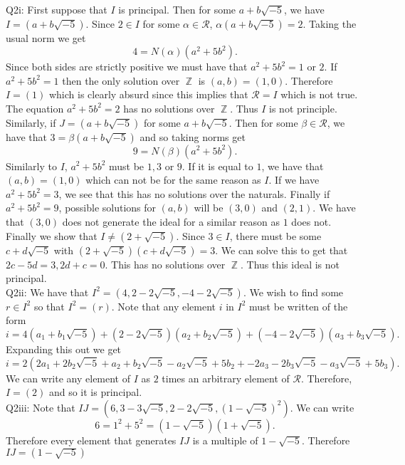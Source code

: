 \documentclass[letterpaper]{article}
\DeclareMathOperator{\Z}{\mathbb{Z}}
\newcommand{\ring}{\mathcal{R}}
\begin{document}
 
\noindent Q2i: First suppose that $I$ is principal. Then for some $a+b\sqrt{-5}$, we have $I = (a+ b\sqrt{-5}).$ Since $2\in I$ for some $\alpha \in \ring$, $\alpha (a+ b\sqrt{-5}) = 2.$ 
Taking the usual norm we get $$4 = N(\alpha) (a^2+5b^2).$$ Since both sides are strictly positive we must have that $a^2+5b^2 =1$ or $2$. If $a^2+5b^2=1$ then the only solution over $\Z$ is $(a,b) = (1,0)$. 
Therefore $I = (1)$ which is clearly absurd since this implies that $\ring = I$ which is not true. The equation $a^2+ 5b^2=2$ has no solutions over $\Z$. Thus $I$ is not principle. 
Similarly, if $J = (a+b \sqrt{-5})$ for some $a+ b\sqrt{-5}$. Then for some $\beta \in \ring$, we have that $3 = \beta (a+ b\sqrt{-5})$ and so taking norms get $$9 = N(\beta)(a^2+5b^2).$$ 
Similarly to $I$, $a^2+5b^2$ must be $1,3$ or $9$.  If it is equal to $1$, we have that $(a,b) = (1,0)$ which can not be for the same reason as $I$. If we have $a^2+5b^2=3$, we see that this has no solutions over the naturals. 
Finally if $a^2+5b^2=9$, possible solutions for $(a,b)$ will be $(3,0)$ and $(2,1)$. We have that $(3,0)$ does not generate the ideal for a similar reason as $1$ does not. Finally we show that $I \neq (2+\sqrt{-5})$. Since $3\in I$, 
there must be some $c+ d\sqrt{-5}$ with $(2+\sqrt{-5})(c+d\sqrt{-5}) = 3.$ We can solve this to get that $2c-5d =3, 2d+c = 0$. This has no solutions over $\Z$. Thus this ideal is not principal. 
\newline \\ Q2ii: We have that $I^2 = (4,2-2\sqrt{-5}, -4-2\sqrt{-5})$. We wish to find some $r\in I^2$ so that $I^2= (r)$. Note that any element $i$ in $I^2$ must be written of the form $$ i= 4(a_1 + b_1\sqrt{-5}) + (2-2\sqrt{-5})(a_2 + b_2\sqrt{-5})+ (-4-2\sqrt{-5})(a_3+b_3\sqrt{-5}). $$ Expanding this out we get $$i = 2(2a_1+2b_2\sqrt{-5} + a_2 + b_2\sqrt{-5}-a_2\sqrt{-5} + 5b_2 + -2a_3-2b_3\sqrt{-5} - a_3\sqrt{-5}+ 5b_3).$$
We can write any element of $I$ as $2$ times an arbitrary element of $\ring$. Therefore, $I = (2)$ and so it is principal. 
\newline \\ Q2iii: Note that $IJ = ( 6,3-3\sqrt{-5}, 2-2\sqrt{-5}, (1-\sqrt{-5})^2).$ We can write $$6 = 1^2+5^2 = (1-\sqrt{-5})(1+\sqrt{-5}).$$ Therefore every element that generates $IJ$ is a multiple of $1-\sqrt{-5}$. Therefore $IJ = (1-\sqrt{-5})$ 
\end{document}
